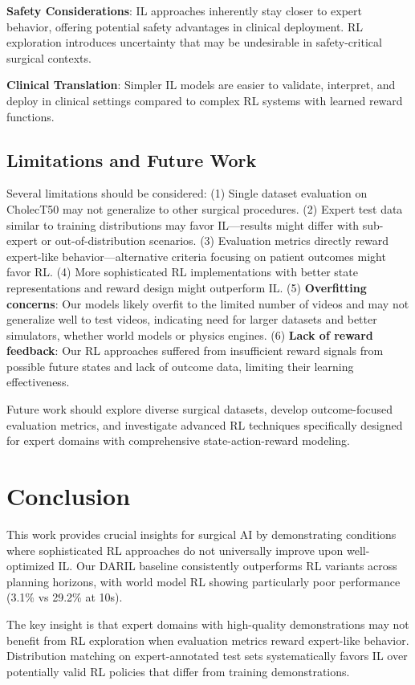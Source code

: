 \documentclass[runningheads]{llncs}
\begin{document}
\textbf{Safety Considerations}: IL approaches inherently stay closer to expert behavior, offering potential safety advantages in clinical deployment. RL exploration introduces uncertainty that may be undesirable in safety-critical surgical contexts.

\textbf{Clinical Translation}: Simpler IL models are easier to validate, interpret, and deploy in clinical settings compared to complex RL systems with learned reward functions.

\subsection{Limitations and Future Work}

Several limitations should be considered: (1) Single dataset evaluation on CholecT50 may not generalize to other surgical procedures. (2) Expert test data similar to training distributions may favor IL—results might differ with sub-expert or out-of-distribution scenarios. (3) Evaluation metrics directly reward expert-like behavior—alternative criteria focusing on patient outcomes might favor RL. (4) More sophisticated RL implementations with better state representations and reward design might outperform IL. (5) \textbf{Overfitting concerns}: Our models likely overfit to the limited number of videos and may not generalize well to test videos, indicating need for larger datasets and better simulators, whether world models or physics engines. (6) \textbf{Lack of reward feedback}: Our RL approaches suffered from insufficient reward signals from possible future states and lack of outcome data, limiting their learning effectiveness.

Future work should explore diverse surgical datasets, develop outcome-focused evaluation metrics, and investigate advanced RL techniques specifically designed for expert domains with comprehensive state-action-reward modeling.

\section{Conclusion}

This work provides crucial insights for surgical AI by demonstrating conditions where sophisticated RL approaches do not universally improve upon well-optimized IL. Our DARIL baseline consistently outperforms RL variants across planning horizons, with world model RL showing particularly poor performance (3.1\% vs 29.2\% at 10s).

The key insight is that expert domains with high-quality demonstrations may not benefit from RL exploration when evaluation metrics reward expert-like behavior. Distribution matching on expert-annotated test sets systematically favors IL over potentially valid RL policies that differ from training demonstrations.
\end{document}
